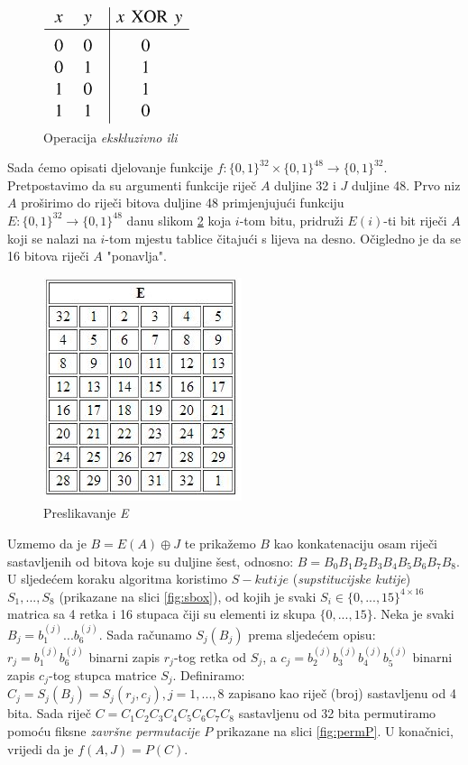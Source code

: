 \documentclass[a4paper,oneside,12pt]{memoir} %
\begin{document}
\begin{spacing}{1.5}
\begin{figure}[h]
\centering \includegraphics[scale=0.8]{XOR.png}
\caption{Operacija \textit{ekskluzivno ili}}
\label{fig:XOR}
\end{figure}
Sada ćemo opisati djelovanje funkcije $f:\{0,1\}^{32} \times \{0,1\}^{48} \to \{0,1\}^{32}$. Pretpostavimo da su argumenti funkcije riječ $A$ duljine 32 i $J$ duljine 48.
Prvo niz $A$ proširimo do riječi bitova duljine 48 primjenjujući funkciju $E:\{0,1\}^{32} \to \{0,1\}^{48}$ danu slikom \ref{fig:fjaE} koja $i$-tom bitu, pridruži $E(i)$-ti bit riječi $A$ koji se nalazi na $i$-tom mjestu tablice čitajući s lijeva na desno. Očigledno je da se 16 bitova riječi $A$ "ponavlja".
\begin{figure}[h]
\centering \includegraphics[scale=1]{E.jpg}
\caption{Preslikavanje \textit{E}}
\label{fig:fjaE}
\end{figure}
Uzmemo da je $B=E(A)\oplus J$ te prikažemo $B$ kao konkatenaciju osam riječi sastavljenih od bitova koje su duljine šest, odnosno: $B=B_0B_1B_2B_3B_4B_5B_6B_7B_8$. U sljedećem koraku algoritma koristimo $S-kutije$ (\textit{supstitucijske kutije}) $S_1, ..., S_8$ (prikazane na slici \ref{fig:sbox}), od kojih je svaki $S_i \in \{0,...,15\}^{4\times 16}$ matrica sa 4 retka i 16 stupaca čiji su elementi iz skupa $\{0,...,15\}$. Neka je svaki $B_j=b_1^{(j)}...b_6^{(j)}$. Sada računamo $S_j(B_j)$ prema sljedećem opisu:\\$r_j=b_1^{(j)}b_6^{(j)}$ binarni zapis $r_j$-tog retka od $S_j$, a $c_j=b_2^{(j)}b_3^{(j)}b_4^{(j)}b_5^{(j)}$ binarni zapis $c_j$-tog stupca matrice $S_j$. Definiramo: $C_j=S_j(B_j)=S_j(r_j, c_j), j=1,...,8$ zapisano kao riječ (broj) sastavljenu od 4 bita. Sada riječ $C=C_1C_2C_3C_4C_5C_6C_7C_8$ sastavljenu od 32 bita permutiramo pomoću fiksne \textit{završne permutacije} $P$ prikazane na slici \ref{fig:permP}. U konačnici, vrijedi da je $f(A,J)=P(C)$.	

\end{spacing}
\end{document}
